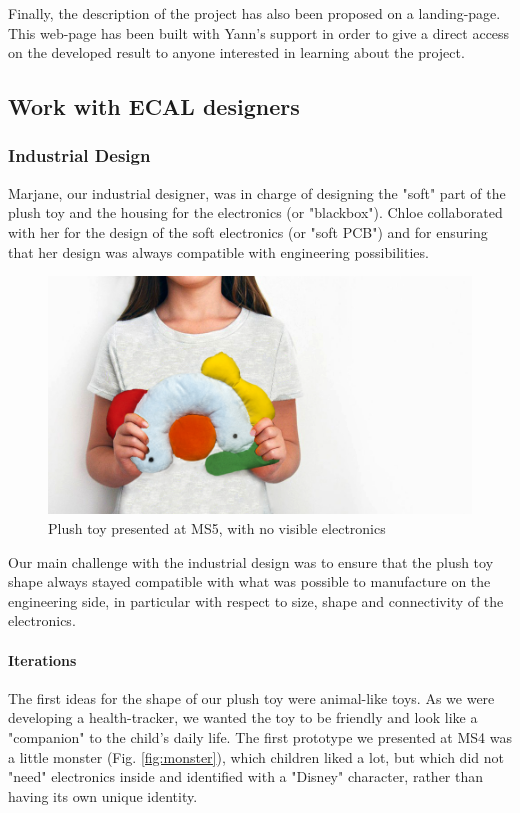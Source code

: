 \medskip
Finally, the description of the project has also been proposed on a landing-page. This web-page \cite{toygether_web} has been built with Yann's support in order to give a direct access on the developed result to anyone interested in learning about the project.

\newpage
\subsection{Work with ECAL designers}

\subsubsection{Industrial Design}
Marjane, our industrial designer, was in charge of designing the "soft" part of the plush toy and the housing for the electronics (or "blackbox"). Chloe collaborated with her for the design of the soft electronics (or "soft PCB") and for ensuring that her design was always compatible with engineering possibilities. 

\vspace{1cm}
\begin{figure}[ht]
    \centering
    \includegraphics[scale=0.38]{images/kid_toygether.jpg}
    \caption{Plush toy presented at MS5, with no visible electronics}
    \label{fig:kid}
\end{figure}
Our main challenge with the industrial design was to ensure that the plush toy shape always stayed compatible with what was possible to manufacture on the engineering side, in particular with respect to size, shape and connectivity of the electronics. 

\paragraph{Iterations} The first ideas for the shape of our plush toy were animal-like toys. As we were developing a health-tracker, we wanted the toy to be friendly and look like a "companion" to the child's daily life. The first prototype we presented at MS4 was a little monster (Fig. \ref{fig:monster}), which children liked a lot, but which did not "need" electronics inside and identified with a "Disney" character, rather than having its own unique identity.

